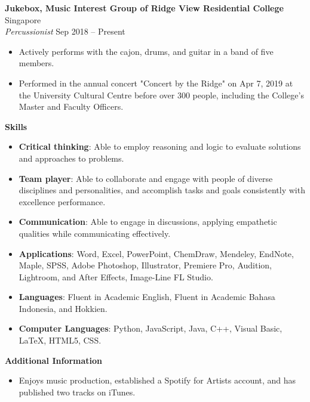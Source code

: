 \documentclass[a4paper, 11pt]{article}
\newcommand{\interspace}{\vspace{10pt}}
\begin{document}
	\textbf{Jukebox, Music Interest Group of Ridge View Residential College} \hfill Singapore\\
	\textit{Percussionist} \hfill Sep 2018 -- Present
	\begin{itemize}[leftmargin=*, noitemsep, topsep=0pt]
		\item Actively performs with the cajon, drums, and guitar in a band of five members.
		\item Performed in the annual concert "Concert by the Ridge" on Apr 7, 2019 at the University Cultural Centre before over 300 people, including the College’s Master and Faculty Officers.
	\end{itemize}

	\interspace
	
	\textbf{\large Skills} \hrulefill
	\begin{itemize}[leftmargin=*, noitemsep, topsep=0pt]
		\item \textbf{Critical thinking}: Able to employ reasoning and logic to evaluate solutions and approaches to problems.
		\item \textbf{Team player}: Able to collaborate and engage with people of diverse disciplines and personalities, and accomplish tasks and goals consistently with excellence performance.
		\item \textbf{Communication}: Able to engage in discussions, applying empathetic qualities while communicating effectively.
		\item \textbf{Applications}: Word, Excel, PowerPoint, ChemDraw, Mendeley, EndNote, Maple, SPSS, Adobe Photoshop, Illustrator, Premiere Pro, Audition, Lightroom, and After Effects, Image-Line FL Studio.
		\item \textbf{Languages}: Fluent in Academic English, Fluent in Academic Bahasa Indonesia, and Hokkien.
		\item \textbf{Computer Languages}: Python, JavaScript, Java, C++, Visual Basic, \LaTeX, HTML5, CSS.
	\end{itemize}

	\interspace
	
	\textbf{\large Additional Information} \hrulefill
	\begin{itemize}[leftmargin=*, noitemsep, topsep=0pt]
		\item Enjoys music production, established a Spotify for Artists account, and has published two tracks on iTunes.
	\end{itemize}
\end{document}
